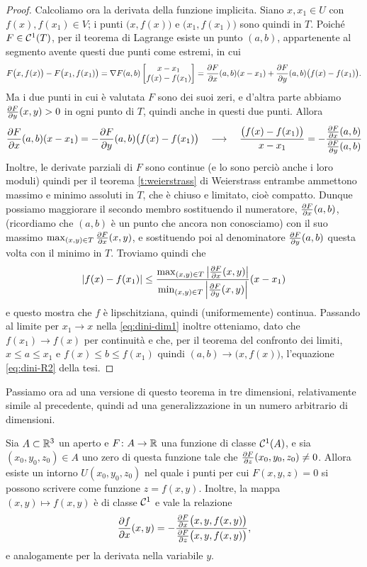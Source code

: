 \begin{proof}
	Calcoliamo ora la derivata della funzione implicita.
	Siano $x,x_1\in U$ con $f(x),f(x_1)\in V$; i punti $\big(x,f(x)\big)$ e $\big(x_1,f(x_1)\big)$ sono quindi in $T$.
	Poiché $F\in\mathcal{C}^{{1}}(T)$, per il teorema di Lagrange esiste un punto $(a,b)$, appartenente al segmento avente questi due punti come estremi, in cui
	\begin{equation}
		F\big(x,f(x)\big)-F\big(x_1,f(x_1)\big)=\nabla F(a,b)
		\begin{bmatrix}
			x-x_1\\
			f(x)-f(x_1)
		\end{bmatrix}
		=\frac{\partial {F}}{\partial {x}}(a,b)(x-x_1)+\frac{\partial {F}}{\partial {y}}(a,b)\big(f(x)-f(x_1)\big).
	\end{equation}
	Ma i due punti in cui è valutata $F$ sono dei suoi zeri, e d'altra parte abbiamo $\frac{\partial {F}}{\partial {y}}(x,y)>0$ in ogni punto di $T$, quindi anche in questi due punti.
	Allora
	\begin{equation} \label{eq:dini-dim1}
		\frac{\partial {F}}{\partial {x}}(a,b)(x-x_1)=-\frac{\partial {F}}{\partial {y}}(a,b)\big(f(x)-f(x_1)\big)\quad\longrightarrow\quad
		\frac{\big(f(x)-f(x_1)\big)}{x-x_1}=-\dfrac{\frac{\partial {F}}{\partial {x}}(a,b)}{\frac{\partial {F}}{\partial {y}}(a,b)}
	\end{equation}
	Inoltre, le derivate parziali di $F$ sono continue (e lo sono perciò anche i loro moduli) quindi per il teorema \ref{t:weierstrass} di Weierstrass entrambe ammettono massimo e minimo assoluti in $T$, che è chiuso e limitato, cioè compatto.
	Dunque possiamo maggiorare il secondo membro sostituendo il numeratore, $\frac{\partial {F}}{\partial {x}}(a,b)$, (ricordiamo che $(a,b)$ è un punto che ancora non conosciamo) con il suo massimo $\max_{(x,y)\in T}\frac{\partial {F}}{\partial {x}}(x,y)$, e sostituendo poi al denominatore $\frac{\partial {F}}{\partial {y}}(a,b)$ questa volta con il minimo in $T$.
	Troviamo quindi che
	\begin{equation}
		\left|{f(x)-f(x_1)}\right|\leq\frac{\max_{(x,y)\in T}\left|{\frac{\partial {F}}{\partial {x}}(x,y)}\right|}{\min_{(x,y)\in T}\left|{\frac{\partial {F}}{\partial {y}}(x,y)}\right|}(x-x_1)
	\end{equation}
	e questo mostra che $f$ è lipschitziana, quindi (uniformemente) continua.
	Passando al limite per $x_1\to x$ nella \eqref{eq:dini-dim1} inoltre otteniamo, dato che $f(x_1)\to f(x)$ per continuità e che, per il teorema del confronto dei limiti, $x\leq a\leq x_1$ e $f(x)\leq b\leq f(x_1)$ quindi $(a,b)\to\big(x,f(x)\big)$, l'equazione \eqref{eq:dini-R2} della tesi.
\end{proof}
Passiamo ora ad una versione di questo teorema in tre dimensioni, relativamente simile al precedente, quindi ad una generalizzazione in un numero arbitrario di dimensioni.
\begin{teorema} \label{t:dini-R3}
	Sia $A\subset\mathbb{R}^3$ un aperto e $F\colon A\to\mathbb{R}$ una funzione di classe $\mathcal{C}^{{1}}(A)$, e sia $(x_0,y_0,z_0)\in A$ uno zero di questa funzione tale che $\frac{\partial {F}}{\partial {z}}(x_0,y_0,z_0)\neq 0$.
	Allora esiste un intorno $U(x_0,y_0,z_0)$ nel quale i punti per cui $F(x,y,z)=0$ si possono scrivere come funzione $z=f(x,y)$.
	Inoltre, la mappa $(x,y)\mapsto f(x,y)$ è di classe $\mathcal{C}^{{1}}$ e vale la relazione
	\begin{equation}
		\frac{\partial {f}}{\partial {x}}(x,y)=-\dfrac{\frac{\partial {F}}{\partial {x}}\big(x,y,f(x,y)\big)}{\frac{\partial {F}}{\partial {z}}\big(x,y,f(x,y)\big)},
	\label{eq:dini-R3}
\end{equation}
	e analogamente per la derivata nella variabile $y$.
\end{teorema}

